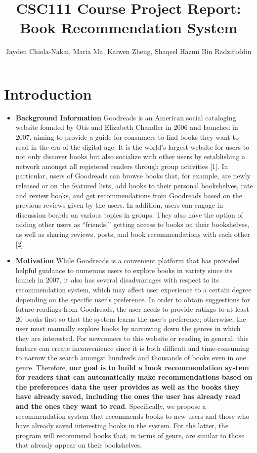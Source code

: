 \documentclass[fontsize=11pt]{article}
\title{CSC111 Course Project Report: Book Recommendation System}
\author{Jayden Chiola-Nakai, Maria Ma, Kaiwen Zheng, Shaqeel Hazmi Bin Radzifuddin}
\begin{document}
\maketitle

\section*{Introduction}

\begin{itemize}
\item \textbf{Background Information }Goodreads is an American social cataloging website founded by Otis and Elizabeth Chandler in 2006 and launched in 2007, aiming to provide a guide for consumers to find books they want to read in the era of the digital age. It is the world’s largest website for users to not only discover books but also socialize with other users by establishing a network amongst all registered readers through group activities [1]. In particular, users of Goodreads can browse books that, for example, are newly released or on the featured lists, add books to their personal bookshelves, rate and review books, and get recommendations from Goodreads based on the previous reviews given by the users. In addition, users can engage in discussion boards on various topics in groups. They also have the option of adding other users as “friends,” getting access to books on their bookshelves, as well as sharing reviews, posts, and book recommendations with each other [2].

\item \textbf{Motivation }While Goodreads is a convenient platform that has provided helpful guidance to numerous users to explore books in variety since its launch in 2007, it also has several disadvantages with respect to its recommendation system, which may affect user experience to a certain degree depending on the specific user’s preference. In order to obtain suggestions for future readings from Goodreads, the user needs to provide ratings to at least 20 books first so that the system learns the user’s preference; otherwise, the user must manually explore books by narrowing down the genres in which they are interested. For newcomers to this website or reading in general, this feature can create inconvenience since it is both difficult and time-consuming to narrow the search amongst hundreds and thousands of books even in one genre. Therefore, \textbf{our goal is to build a book recommendation system for readers that can automatically make recommendations based on the preferences data the user provides as well as the books they have already saved, including the ones the user has already read and the ones they want to read}. Specifically, we propose a recommendation system that recommends books to new users and those who have already saved interesting books in the system. For the latter, the program will recommend books that, in terms of genre, are similar to those that already appear on their bookshelves.
\end{itemize}
\end{document}
